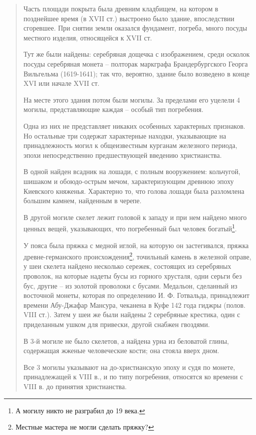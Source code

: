 \begin{quotation}
Часть площади покрыта была древним кладбищем, на котором в позднейшее время (в XVII ст.) выстроено было здание, впоследствии сгоревшее. При снятии земли оказался фундамент, погреба, много посуды местного изделия, относящейся к XVII ст. 

Тут же были найдены: серебряная дощечка с изображением, среди осколок посуды серебряная монета – полторак маркграфа Брандербургского Георга Вильгельма (1619-1641); так что, вероятно, здание было возведено в конце XVI или начале XVII ст.

На месте этого здания потом были могилы. За пределами его уцелели 4 могилы, представляющие каждая – особый тип погребения.

Одна из них не представляет никаких особенных характерных признаков. Но остальные три содержат характерные находки, указывающие на принадлежность могил к общеизвестным курганам железного периода, эпохи непосредственно предшествующей введению христианства.

В одной найден всадник на лошади, с полным вооружением: кольчугой, шишаком и обо\-юдо-острым мечом, характеризующим древнюю эпоху Киевского княженья. Характерно то, что голова лошади была разломлена большим камнем, найденным в черепе.

В другой могиле скелет лежит головой к западу и при нем найдено много ценных вещей, указывающих, что погребенный был человек богатый\footnote{А могилу никто не разграбил до 19 века.}.

У пояса была пряжка с медной иглой, на которую он застегивался, пряжка древне-герман\-ского происхождения\footnote{Местные мастера не могли сделать пряжку?}, точильный камень в железной оправе, у шеи скелета найдено нес\-колько сережек, состоящих из серебряных проволок, на которые надеты бусы из горного хрусталя, одни серьги без бус, другие – из золотой проволоки с бусами. Медальон, сделанный из восточной монеты, которая по определению И. Ф. Готвальда, принадлежит времени Абу-Джафар Мансура, чеканена в Куфе 142 года гиджры (полов. VIII ст.). Затем у шеи же были найдены 2 серебряные крестика, один с приделанным ушком для привески, другой снабжен гвоздями.

В 3-й могиле не было скелетов, а найдена урна из беловатой глины, содержащая жженые человеческие кости; она стояла вверх дном.

Все 3 могилы указывают на до-христианскую эпоху и судя по монете, принадлежащей к VIII в., и по типу погребения, относятся ко времени с VIII в. до принятия христианства.


\end{quotation}
